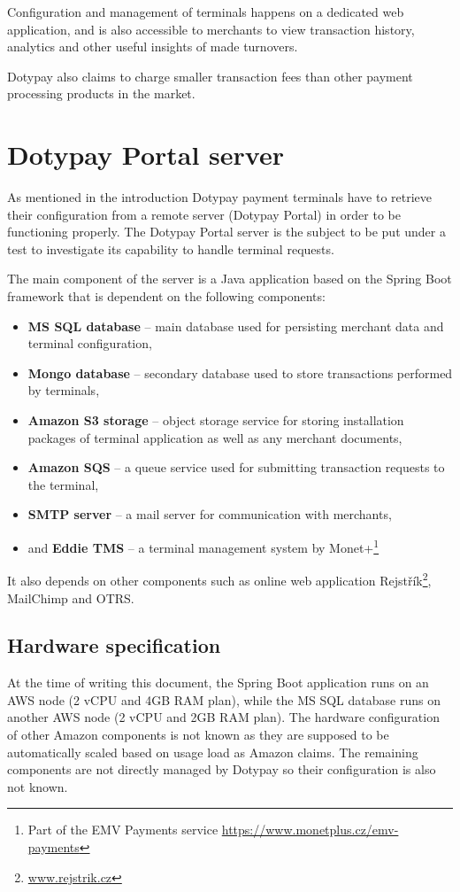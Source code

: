 \documentclass[12pt, a4paper]{article}
\let\oldsection\section
\renewcommand\section{\clearpage\oldsection}
\begin{document}
Configuration and management of terminals happens on a dedicated web application, and is also accessible to merchants to view transaction history, analytics and other useful insights of made turnovers.

Dotypay also claims to charge smaller transaction fees than other payment processing products in the market.


\section{Dotypay Portal server}

As mentioned in the introduction Dotypay payment terminals have to retrieve their configuration from a remote server (Dotypay Portal) in order to be functioning properly. 
The Dotypay Portal server is the subject to be put under a test to investigate its capability to handle terminal requests.

The main component of the server is a Java application based on the Spring Boot framework that is dependent on the following components:

\begin{itemize}
    \item \textbf{MS SQL database} -- main database used for persisting merchant data and terminal configuration,
    \item \textbf{Mongo database}  -- secondary database used to store transactions performed by terminals,
    \item \textbf{Amazon S3 storage}  -- object storage service for storing installation packages of terminal application as well as any merchant documents,
    \item \textbf{Amazon SQS} -- a queue service used for submitting transaction requests to the terminal,
    \item \textbf{SMTP server} -- a mail server for communication with merchants,
    \item and \textbf{Eddie TMS} -- a terminal management system by Monet+\footnote{Part of the EMV Payments service \url{https://www.monetplus.cz/emv-payments}}
\end{itemize}

It also depends on other components such as online web application Rejstřík\footnote{\url{www.rejstrik.cz}}, MailChimp and OTRS.

\subsection{Hardware specification}
At the time of writing this document, the Spring Boot application runs on an AWS node (2 vCPU and 4GB RAM plan), while the MS SQL database runs on another AWS node (2 vCPU and 2GB RAM plan).
The hardware configuration of other Amazon components is not known as they are supposed to be automatically scaled based on usage load as Amazon claims. The remaining components are not directly managed by Dotypay so their configuration is also not known. 
\end{document}
